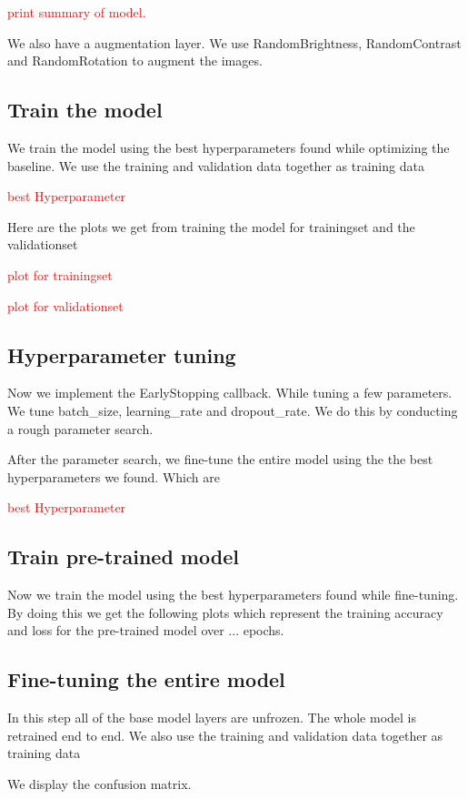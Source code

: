 \documentclass[conference]{IEEEtran}
\begin{document}
\centerline{\textcolor{red}{print summary of model.}}

We also have a augmentation layer. We use RandomBrightness, RandomContrast and RandomRotation to augment the images.

\subsection{Train the model}

We train the model using the best hyperparameters found while optimizing the
baseline. We use the training and validation data together as training data

\centerline{\textcolor{red}{best Hyperparameter}}

Here are the plots we get from training the model for trainingset and the validationset

\centerline{\textcolor{red}{plot for trainingset}}
\centerline{\textcolor{red}{plot for validationset}}



\subsection{Hyperparameter tuning}
Now we implement the EarlyStopping callback. While tuning a few parameters. We tune batch\_size, learning\_rate and dropout\_rate. We do this by conducting a rough parameter search.

After the parameter search, we fine-tune the entire model using the the best hyperparameters we found. Which are
\centerline{\textcolor{red}{best Hyperparameter}}

\subsection{Train pre-trained model}
Now we train the model using the best hyperparameters found while fine-tuning.
By doing this we get the following plots which represent the training accuracy and loss for the pre-trained model over ... epochs.

\subsection{Fine-tuning the entire model}
In this step all of the base model layers are unfrozen. The whole model is retrained end to end. We also use the training and validation data together as training data

We display the confusion matrix. 
\end{document}
